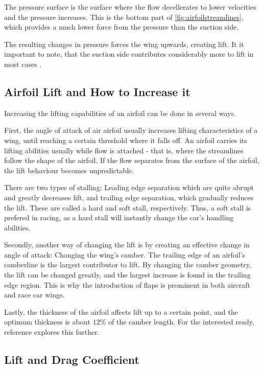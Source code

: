   The pressure surface is the surface where the flow decellerates to lower velocities and the pressure increases. This is the bottom part of \ref{fig:airfoilstreamlines}, which provides a much lower force from the pressure than the suction side.

  The resulting changes in pressure forces the wing upwards, creating lift. It it important to note, that the suction side contributes considerably more to lift in most cases \cite{jkatz}.

  \subsection{Airfoil Lift and How to Increase it}

    Increasing the lifting capabilities of an airfoil can be done in several ways.

    First, the angle of attack of air airfoil usually increases lifting characteristics of a wing, until reaching a certain threshold where it falls off. An airfoil carries its lifting abilities usually while flow is attached - that is, where the streamlines follow the shape of the airfoil. If the flow separates from the surface of the airfoil, the lift behaviour becomes unpredictable.

    There are two types of stalling: Leading edge separation which are quite abrupt and greatly decreases lift, and trailing edge separation, which gradually reduces the lift. These are called a hard and soft stall, respectively. Thus, a soft stall is prefered in racing, as a hard stall will instantly change the car's handling abilities.

    Secondly, another way of changing the lift is by creating an effective change in angle of attack: Changing the wing's camber. The trailing edge of an airfoil's camberline is the largest contributor to lift. By changing the camber geometry, the lift can be changed greatly, and the largest increase is found in the trailing edge region. This is why the introduction of flaps is prominent in both aircraft and race car wings.

    Lastly, the thickness of the airfoil affects lift up to a certain point, and the optimum thickness is about $12\%$ of the camber length. For the interested ready, reference \cite{jkatz} explores this further.

  \subsection{Lift and Drag Coefficient}

